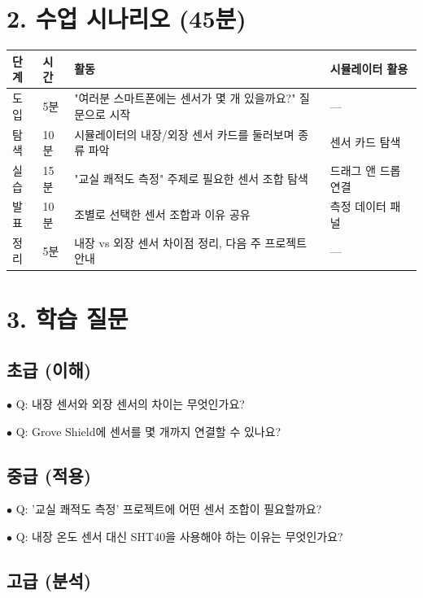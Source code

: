 \documentclass[11pt,a4paper]{article}
\begin{document}
\section*{2. 수업 시나리오 (45분)}

\begin{center}
\renewcommand{\arraystretch}{1.4}
\begin{tabular}{|p{1.5cm}|p{1.5cm}|p{8.6cm}|p{3.4cm}|}
\hline
\rowcolor{tableheader}
\textbf{단계} & \textbf{시간} & \textbf{활동} & \textbf{시뮬레이터 활용} \\
\hline
도입 & 5분 & "여러분 스마트폰에는 센서가 몇 개 있을까요?" 질문으로 시작 & — \\
\hline
탐색 & 10분 & 시뮬레이터의 내장/외장 센서 카드를 둘러보며 종류 파악 & 센서 카드 탐색 \\
\hline
실습 & 15분 & "교실 쾌적도 측정" 주제로 필요한 센서 조합 탐색 & 드래그 앤 드롭 연결 \\
\hline
발표 & 10분 & 조별로 선택한 센서 조합과 이유 공유 & 측정 데이터 패널 \\
\hline
정리 & 5분 & 내장 vs 외장 센서 차이점 정리, 다음 주 프로젝트 안내 & — \\
\hline
\end{tabular}
\end{center}


\section*{3. 학습 질문}

\subsection*{초급 (이해)}

$\bullet$ Q: 내장 센서와 외장 센서의 차이는 무엇인가요?

$\bullet$ Q: Grove Shield에 센서를 몇 개까지 연결할 수 있나요?


\subsection*{중급 (적용)}

$\bullet$ Q: '교실 쾌적도 측정' 프로젝트에 어떤 센서 조합이 필요할까요?

$\bullet$ Q: 내장 온도 센서 대신 SHT40을 사용해야 하는 이유는 무엇인가요?


\subsection*{고급 (분석)}
\end{document}
